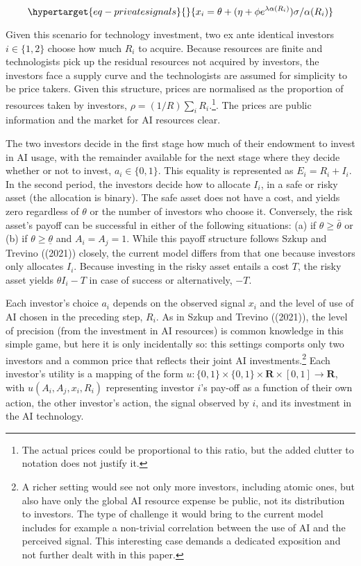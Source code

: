\documentclass[
]{article}
\theoremstyle{plain}
\theoremstyle{definition}
\theoremstyle{remark}
\begin{document}
\begin{equation}\protect\hypertarget{eq-privatesignals}{}{
x_i = \theta + (\eta + \phi e^{\lambda \alpha(R_i)}) \sigma / \alpha(R_i)
}\label{eq-privatesignals}\end{equation}

Given this scenario for technology investment, two ex ante identical
investors \(i \in \{1,2\}\) choose how much \(R_i\) to acquire. Because
resources are finite and technologists pick up the residual resources
not acquired by investors, the investors face a supply curve and the
technologists are assumed for simplicity to be price takers. Given this
structure, prices are normalised as the proportion of resources taken by
investors, \(\rho = (1/R)\sum_i R_i\).\footnote{The actual prices could
  be proportional to this ratio, but the added clutter to notation does
  not justify it.}. The prices are public information and the market for
AI resources clear.

The two investors decide in the first stage how much of their endowment
to invest in AI usage, with the remainder available for the next stage
where they decide whether or not to invest, \(a_i \in \{0, 1\}\). This
equality is represented as \(E_i = R_i + I_i\). In the second period,
the investors decide how to allocate \(I_i\), in a safe or risky asset
(the allocation is binary). The safe asset does not have a cost, and
yields zero regardless of \(\theta\) or the number of investors who
choose it. Conversely, the risk asset's payoff can be successful in
either of the following situations: (a) if \(\theta \geq \bar{\theta}\)
or (b) if \(\theta \geq \underline{\theta}\) and \(A_i = A_j = 1\).
While this payoff structure follows Szkup and Trevino ((2021)) closely,
the current model differs from that one because investors only allocates
\(I_i\). Because investing in the risky asset entails a cost \(T\), the
risky asset yields \(\theta I_i - T\) in case of success or
alternatively, \(-T\).

Each investor's choice \(a_i\) depends on the observed signal \(x_i\)
and the level of use of AI chosen in the preceding step, \(R_i\). As in
Szkup and Trevino ((2021)), the level of precision (from the investment
in AI resources) is common knowledge in this simple game, but here it is
only incidentally so: this settings comports only two investors and a
common price that reflects their joint AI investments.\footnote{A richer
  setting would see not only more investors, including atomic ones, but
  also have only the global AI resource expense be public, not its
  distribution to investors. The type of challenge it would bring to the
  current model includes for example a non-trivial correlation between
  the use of AI and the perceived signal. This interesting case demands
  a dedicated exposition and not further dealt with in this paper.} Each
investor's utility is a mapping of the form
\(u : \{0, 1\} \times \{0, 1\} \times \mathbf{R} \times [0, 1] \to \mathbf{R}\),
with \(u(A_i, A_j, x_i, R_i)\) representing investor \(i\)'s pay-off as
a function of their own action, the other investor's action, the signal
observed by \(i\), and its investment in the AI technology.
\end{document}
